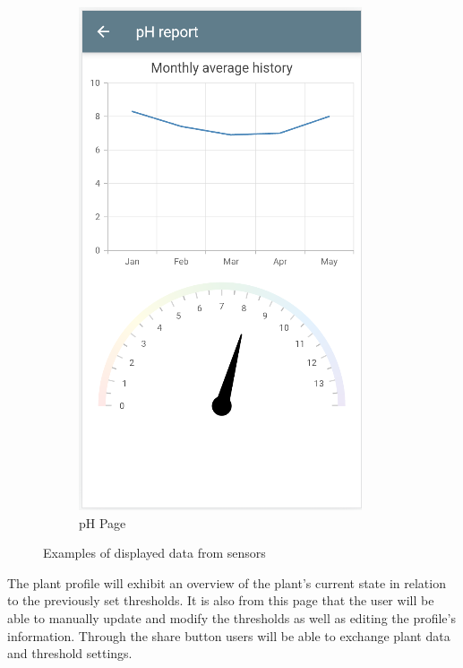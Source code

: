 \begin{figure}
\begin{subfigure}[b]{0.3\columnwidth}
        \includegraphics[width=\columnwidth]{images/pH.png}
        \caption{pH Page}
    \end{subfigure}
    \caption{Examples of displayed data from sensors}
    \label{fig:Examples of Displayed Data}
\end{figure}

The plant profile will exhibit an overview of the plant's current state in relation
to the previously set thresholds. It is also from this page that the user will be
able to manually update and modify the thresholds as well as editing the profile's
information. Through the share button users will be able to exchange plant data
and threshold settings. 

